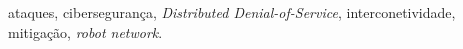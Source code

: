 \documentclass[journal]{IEEEtran}
\begin{document}
\renewcommand\IEEEkeywordsname{Palavras-chave}
\begin{IEEEkeywords}
  ataques, cibersegurança, \textit{Distributed Denial-of-Service}, interconetividade, mitigação, \textit{robot network}.
\end{IEEEkeywords}













\ifCLASSOPTIONcaptionsoff
  \newpage
\fi


%
%
%



\renewcommand{\refname}{Referências Bibliográficas}

% 
\end{document}
